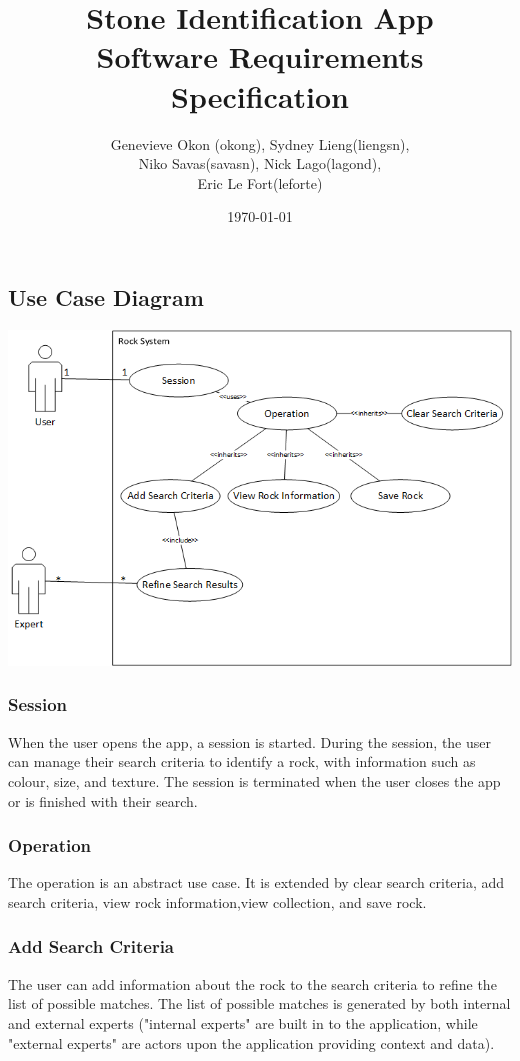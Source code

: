 \documentclass[titlepage]{article}
\title{Stone Identification App \\
  Software Requirements Specification}
\author{Genevieve Okon (okong), Sydney Lieng(liengsn),\\
  Niko Savas(savasn), Nick Lago(lagond),\\
  Eric Le Fort(leforte)}
\date{\today}
\begin{document}
\maketitle
\newpage

\subsection{Use Case Diagram}

  \includegraphics[scale = 0.5]{../resources/UseCaseDiagram.png}
  \subsubsection{Session}
    When the user opens the app, a session is started. During the session, the user can manage their search criteria to identify a rock, with information such as colour, size, and texture. The session is terminated when the user closes the app or is finished with their search.
  \subsubsection{Operation}
    The operation is an abstract use case. It is extended by clear search criteria, add search criteria, view rock information,view collection, and save rock.
  \subsubsection{Add Search Criteria}
    The user can add information about the rock to the search criteria to refine the list of possible matches. The list of possible matches is generated by both internal and external experts ("internal experts" are built in to the application, while "external experts" are actors upon the application providing context and data).
\end{document}
